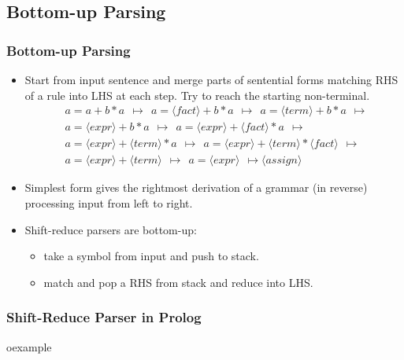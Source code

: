 \subsection{Bottom-up Parsing}
\begin{frame}
\frametitle{Bottom-up Parsing}
\begin{itemize}
\item Start from input sentence and merge parts of sentential forms matching RHS of a rule into LHS at each step. Try to reach the starting non-terminal.
	\\ {\small
	\[ \begin{array}{l}
	~~ a = a + b * a  ~~ \mapsto
	~~ a = \langle fact \rangle + b * a  ~~ \mapsto 
	~~ a = \langle term\rangle + b * a  ~~ \mapsto \\
	~~ a = \langle expr\rangle + b * a  ~~ \mapsto
	~~ a = \langle expr\rangle + \langle fact\rangle * a  ~~ \mapsto \\
	~~ a = \langle expr\rangle + \langle term\rangle * a  ~~ \mapsto
	~~ a = \langle expr\rangle + \langle term\rangle * \langle fact\rangle  ~~ \mapsto \\
	~~ a = \langle expr\rangle + \langle term\rangle ~~ \mapsto
	~~ a = \langle expr\rangle ~~ \mapsto
	\langle assign \rangle 
\end{array}
	\]}
\item Simplest form gives the rightmost derivation of a grammar (in reverse) processing input
	from left to right.
\item Shift-reduce parsers are bottom-up:
	\begin{itemize}
	\item {} take a symbol from input and push to stack.
	\item {} match and pop a RHS from stack and reduce into	
	LHS.
	\end{itemize}
\end{itemize}
\end{frame}


\begin{frame}
\frametitle{Shift-Reduce Parser in Prolog}
\begin{beamercolorbox}{oexample}
\codeshiftreduce
\end{beamercolorbox}
\end{frame}

